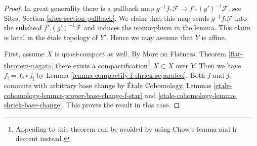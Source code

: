 \begin{proof}
In great generality there is a pullback map
$g^{-1}f_*\mathcal{F} \to f'_*(g')^{-1}\mathcal{F}$, see
Sites, Section \ref{sites-section-pullback}.
We claim that this map sends $g^{-1}f_!\mathcal{F}$
into the subsheaf $f'_!(g')^{-1}\mathcal{F}$
and induces the isomorphism in the lemma.
This claim is local in the \'etale topology of $Y'$.
Hence we may assume that $Y$ is affine.

\medskip\noindent
First, assume $X$ is quasi-compact as well. By More on Flatness, Theorem
\ref{flat-theorem-nagata} there exists a compactification\footnote{Appealing
to this theorem can be avoided by using Chow's lemma and h descent instead.}
$X \subset \overline{X}$ over $Y$. Then we have
$f_! = \overline{f}_* \circ j_!$ by
Lemma \ref{lemma-compactify-f-shriek-separated}.
Both $\overline{f}$ and $j_!$ commute with arbitrary base change
by \'Etale Cohomology, Lemmas
\ref{etale-cohomology-lemma-proper-base-change-f-star} and
\ref{etale-cohomology-lemma-shriek-base-change}.
This proves the result in this case.


\end{proof}
